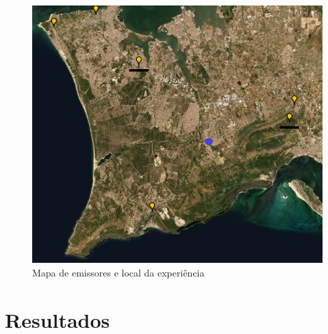 \begin{figure}[h]
\centering
\includegraphics[scale=0.8]{chapters/ch5/assets/mapaemi}
\caption[Mapa de emissores e local da experiência]{Mapa de emissores e local da experiência}
\label{fig:mapaemi}
\end{figure}

\section{Resultados}

